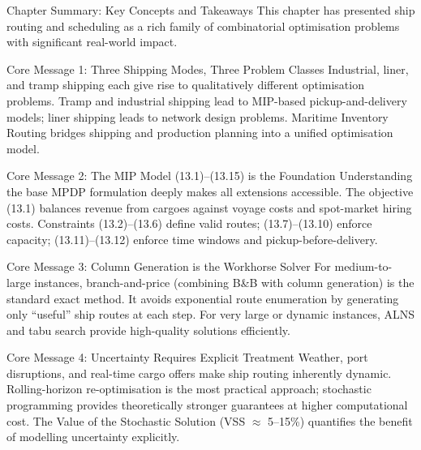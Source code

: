 \documentclass[aspectratio=169,10pt]{beamer}
\begin{document}
\begin{frame}[allowframebreaks]{Chapter Summary: Key Concepts and Takeaways}
  This chapter has presented ship routing and scheduling as a rich family
  of combinatorial optimisation problems with significant real-world impact.

  \medskip
  \begin{block}{Core Message 1: Three Shipping Modes, Three Problem Classes}
    Industrial, liner, and tramp shipping each give rise to qualitatively
    different optimisation problems.  Tramp and industrial shipping lead to
    MIP-based pickup-and-delivery models; liner shipping leads to network
    design problems.  Maritime Inventory Routing bridges shipping and
    production planning into a unified optimisation model.
  \end{block}

  \begin{block}{Core Message 2: The MIP Model (13.1)--(13.15) is the Foundation}
    Understanding the base MPDP formulation deeply makes all extensions
    accessible.  The objective (13.1) balances revenue from cargoes against
    voyage costs and spot-market hiring costs.  Constraints (13.2)--(13.6)
    define valid routes; (13.7)--(13.10) enforce capacity; (13.11)--(13.12)
    enforce time windows and pickup-before-delivery.
  \end{block}

  \begin{block}{Core Message 3: Column Generation is the Workhorse Solver}
    For medium-to-large instances, branch-and-price (combining B\&B with
    column generation) is the standard exact method.  It avoids exponential
    route enumeration by generating only ``useful'' ship routes at each
    step.  For very large or dynamic instances, ALNS and tabu search provide
    high-quality solutions efficiently.
  \end{block}

  \begin{block}{Core Message 4: Uncertainty Requires Explicit Treatment}
    Weather, port disruptions, and real-time cargo offers make ship routing
    inherently dynamic.  Rolling-horizon re-optimisation is the most
    practical approach; stochastic programming provides theoretically stronger
    guarantees at higher computational cost.  The Value of the Stochastic
    Solution (VSS $\approx$ 5--15\%) quantifies the benefit of modelling
    uncertainty explicitly.
  \end{block}


\end{frame}
\end{document}
